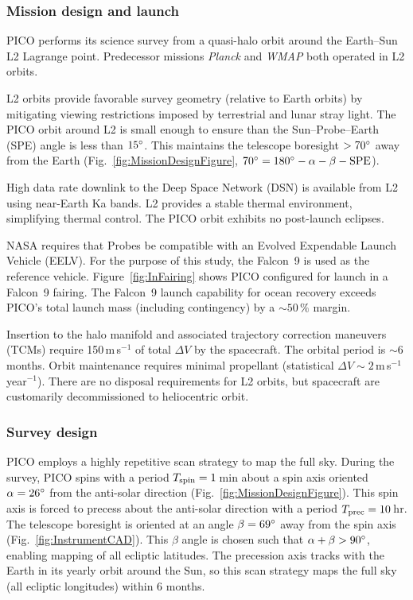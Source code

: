 \subsubsection{Mission design and launch}
\label{sec:mission_design} %

PICO performs its science survey from a quasi-halo orbit around the
Earth--Sun L2 Lagrange point. Predecessor missions \textit{Planck} and
\textit{WMAP} both operated in L2 orbits.

L2 orbits provide favorable survey geometry (relative to Earth orbits)
by mitigating viewing restrictions imposed by terrestrial and lunar
stray light. The PICO orbit around L2 is small enough to ensure than
the Sun--Probe--Earth (SPE) angle is less than $15^\circ$. This
maintains the telescope boresight $>70^\circ$ away from the Earth
(Fig.~\ref{fig:MissionDesignFigure},
$70^\circ = 180^\circ -\alpha - \beta - \rm{SPE}$). 



High data rate downlink to the Deep Space Network (DSN) is available
from L2 using near-Earth Ka bands. L2 provides a stable thermal
environment, simplifying thermal control. The PICO orbit exhibits no
post-launch eclipses.
 
NASA requires that Probes be compatible with an Evolved Expendable
Launch Vehicle (EELV). For the purpose of this study, the Falcon~9
\citep{SpaceX2015} is used as the reference
vehicle. Figure~\ref{fig:InFairing} shows PICO configured for launch
in a Falcon~9 fairing. The Falcon~9 launch capability for ocean
recovery exceeds PICO's total launch mass (including contingency) by a
$\sim 50\,\%$ margin.

Insertion to the halo manifold and associated trajectory correction
maneuvers (TCMs) require 150\,m\,s$^{-1}$ of total $\Delta V$ by the
spacecraft. The orbital period is $\sim6$\,months. Orbit maintenance
requires minimal propellant (statistical
$\Delta V\sim 2$\,m\,s$^{-1}$\,year$^{-1}$). There are no disposal
requirements for L2 orbits, but spacecraft are customarily
decommissioned to heliocentric orbit.


\subsubsection{Survey design}
\label{sec:survey_design} %
 
PICO employs a highly repetitive scan strategy to map the full
sky. During the survey, PICO spins with a period
$T_{\rm spin} = 1$\,min about a spin axis oriented $\alpha=26^\circ$
from the anti-solar direction (Fig.~\ref{fig:MissionDesignFigure}). This spin axis
is forced to precess about the anti-solar direction with a period
$T_{\rm prec}= 10$\,hr. The telescope boresight is oriented at an
angle $\beta=69^\circ$ away from the spin axis (Fig.~\ref{fig:InstrumentCAD}). This $\beta$ angle is
chosen such that $\alpha + \beta > 90^\circ$, enabling mapping of all
ecliptic latitudes. The precession axis tracks with the Earth in its
yearly orbit around the Sun, so this scan strategy maps the full sky
(all ecliptic longitudes) within 6 months.

